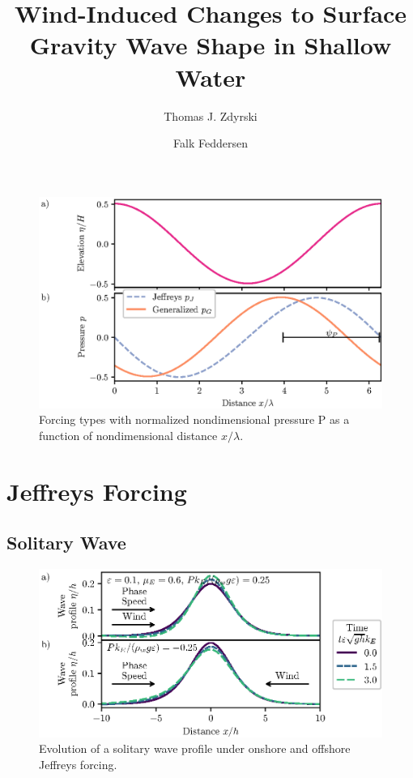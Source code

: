 \documentclass{jfm}
\title{Wind-Induced Changes to Surface Gravity Wave Shape in Shallow Water}
\author{Thomas J. Zdyrski \and Falk Feddersen}
\let\Oldsection\section
\renewcommand{\section}{\FloatBarrier\Oldsection}
\let\Oldsubsection\subsection
\renewcommand{\subsection}{\FloatBarrier\Oldsubsection}
\begin{document}
\begin{figure}
  \centering
  \includegraphics{Forcing-Types.eps}
  \caption{
    Forcing types with normalized nondimensional pressure P as a
    function of nondimensional distance $x/\lambda$.
  }
\end{figure}

\section{Jeffreys Forcing}
\subsection{Solitary Wave}
\begin{figure}
  \centering
  \includegraphics{Snapshots-Positive-Negative.eps}
  \caption{
    Evolution of a solitary wave profile under onshore and offshore Jeffreys
    forcing.
  }
\end{figure}
\end{document}
